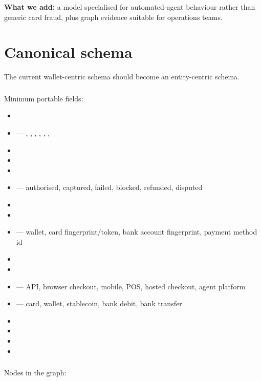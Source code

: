 \documentclass[11pt]{article}
\begin{document}
\textbf{What we add:} a model specialised for automated-agent behaviour rather than generic card fraud, plus graph evidence suitable for operations teams.

\section{Canonical schema}
The current wallet-centric schema should become an entity-centric schema.

\subsubsection*{}
Minimum portable fields:

\begin{itemize}
  \item {}
  \item {} --- , , , , , , 
  \item {}
  \item {}
  \item {}
  \item {} --- authorised, captured, failed, blocked, refunded, disputed
  \item {}
  \item {}
  \item {} --- wallet, card fingerprint/token, bank account fingerprint, payment method id
  \item {}
  \item {}
  \item {} --- API, browser checkout, mobile, POS, hosted checkout, agent platform
  \item {} --- card, wallet, stablecoin, bank debit, bank transfer
  \item {}
  \item {}
  \item {}
  \item {}
\end{itemize}
\subsubsection*{}
Nodes in the graph:
\end{document}
